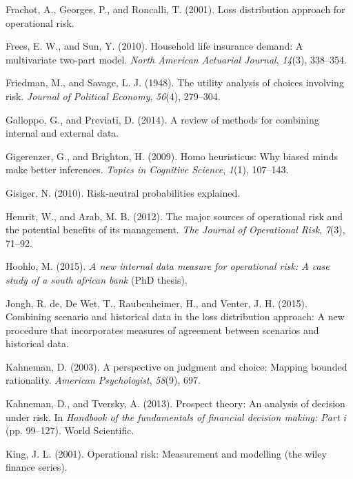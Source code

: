 \documentclass[]{DissertateUSU}
\begin{document}
\hypertarget{ref-frachot2001loss}{}
Frachot, A., Georges, P., and Roncalli, T. (2001). Loss distribution
approach for operational risk.

\hypertarget{ref-frees2010household}{}
Frees, E. W., and Sun, Y. (2010). Household life insurance demand: A
multivariate two-part model. \emph{North American Actuarial Journal},
\emph{14}(3), 338--354.

\hypertarget{ref-friedman1948utility}{}
Friedman, M., and Savage, L. J. (1948). The utility analysis of choices
involving risk. \emph{Journal of Political Economy}, \emph{56}(4),
279--304.

\hypertarget{ref-galloppo2014review}{}
Galloppo, G., and Previati, D. (2014). A review of methods for combining
internal and external data.

\hypertarget{ref-gigerenzer2009homo}{}
Gigerenzer, G., and Brighton, H. (2009). Homo heuristicus: Why biased
minds make better inferences. \emph{Topics in Cognitive Science},
\emph{1}(1), 107--143.

\hypertarget{ref-gisiger2010risk}{}
Gisiger, N. (2010). Risk-neutral probabilities explained.

\hypertarget{ref-hemrit2012major}{}
Hemrit, W., and Arab, M. B. (2012). The major sources of operational
risk and the potential benefits of its management. \emph{The Journal of
Operational Risk}, \emph{7}(3), 71--92.

\hypertarget{ref-hoohlo2015new}{}
Hoohlo, M. (2015). \emph{A new internal data measure for operational
risk: A case study of a south african bank} (PhD thesis).

\hypertarget{ref-de2015combining}{}
Jongh, R. de, De Wet, T., Raubenheimer, H., and Venter, J. H. (2015).
Combining scenario and historical data in the loss distribution
approach: A new procedure that incorporates measures of agreement
between scenarios and historical data.

\hypertarget{ref-kahneman2003perspective}{}
Kahneman, D. (2003). A perspective on judgment and choice: Mapping
bounded rationality. \emph{American Psychologist}, \emph{58}(9), 697.

\hypertarget{ref-kahneman2013prospect}{}
Kahneman, D., and Tversky, A. (2013). Prospect theory: An analysis of
decision under risk. In \emph{Handbook of the fundamentals of financial
decision making: Part i} (pp. 99--127). World Scientific.

\hypertarget{ref-king2001operational}{}
King, J. L. (2001). Operational risk: Measurement and modelling (the
wiley finance series).
\end{document}
